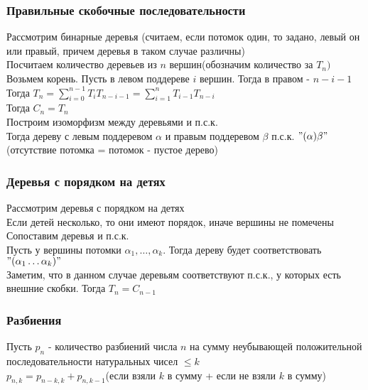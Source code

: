 \documentclass[12pt]{article}
\begin{document}
\subsubsection{Правильные скобочные последовательности}
Рассмотрим бинарные деревья (считаем, если потомок один, то задано, левый он или правый, причем деревья в таком случае различны)\\
Посчитаем количество деревьев из $n$ вершин(обозначим количество за $T_n)$\\
Возьмем корень. Пусть в левом поддереве $i$ вершин. Тогда в правом - $n-i-1$\\
Тогда $T_n = \sum_{i=0}^{n-1}T_iT_{n-i-1} = \sum_{i=1}^{n}T_{i-1}T_{n-i}$\\
Тогда $C_n = T_n$\\
Построим изоморфизм между деревьями и п.с.к.\\
Тогда дереву с левым поддеревом $\alpha$ и правым поддеревом $\beta$ п.с.к. $"(\alpha)\beta"$(отсутствие потомка = потомок - пустое дерево)
\subsubsection{Деревья с порядком на детях}
Рассмотрим деревья с порядком на детях\\
Если детей несколько, то они имеют порядок, иначе вершины не помечены\\
Сопоставим деревья и п.с.к.\\
Пусть у вершины потомки $\alpha_1, \ldots, \alpha_k$. Тогда дереву будет соответствовать $"(\alpha_1\ldots\alpha_k)"$\\
Заметим, что в данном случае деревьям соответствуют п.с.к., у которых есть внешние скобки. Тогда $T_n = C_{n-1}$\\
\subsubsection{Разбиения}
Пусть $p_n$ - количество разбиений числа $n$ на сумму неубывающей положительной последовательности натуральных чисел $\leq k$\\
$p_{n,k} = p_{n-k,k}+p_{n,k-1}$(если взяли $k$ в сумму + если не взяли $k$ в сумму)
\end{document}
